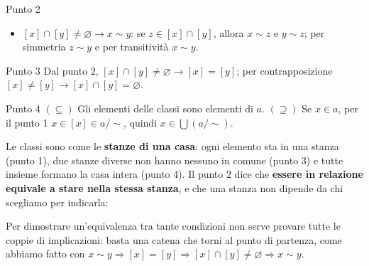 \begin{concetto}
\begin{dimostrazione}
\begin{caso}{Punto 2}
\begin{itemize}
            \item[] $[x] \cap [y] \neq \varnothing \rightarrow x \sim y$: se $z \in [x] \cap [y]$, allora $x \sim z$ e $y \sim z$; per
                    simmetria $z \sim y$ e per transitività $x \sim y$.
        \end{itemize}
    \end{caso}
    \begin{caso}{Punto 3}
        Dal punto 2, $[x] \cap [y] \neq \varnothing \rightarrow [x] = [y]$; per contrapposizione $[x] \neq [y] \rightarrow [x] \cap [y] = \varnothing$.
    \end{caso}
    \begin{caso}{Punto 4}
        $(\subseteq)$ Gli elementi delle classi sono elementi di $a$. $(\supseteq)$ Se $x \in a$, per il punto 1 $x \in [x] \in a/{\sim}$,
        quindi $x \in \bigcup(a/{\sim})$.
    \end{caso}
\end{dimostrazione}
\end{concetto}

\begin{spiegazione}
    Le classi sono come le \textbf{stanze di una casa}: ogni elemento sta in una stanza (punto 1), due stanze diverse non hanno
    nessuno in comune (punto 3) e tutte insieme formano la casa intera (punto 4). Il punto 2 dice che \textbf{essere in
    relazione equivale a stare nella stessa stanza}, e che una stanza non dipende da chi scegliamo per indicarla:
    \begin{center}
    \end{center}
    Per dimostrare un'equivalenza tra tante condizioni non serve provare tutte le coppie di implicazioni: basta una catena che
    torni al punto di partenza, come abbiamo fatto con
    $x \sim y \Rightarrow [x] = [y] \Rightarrow [x] \cap [y] \neq \varnothing \Rightarrow x \sim y$.
\end{spiegazione}

